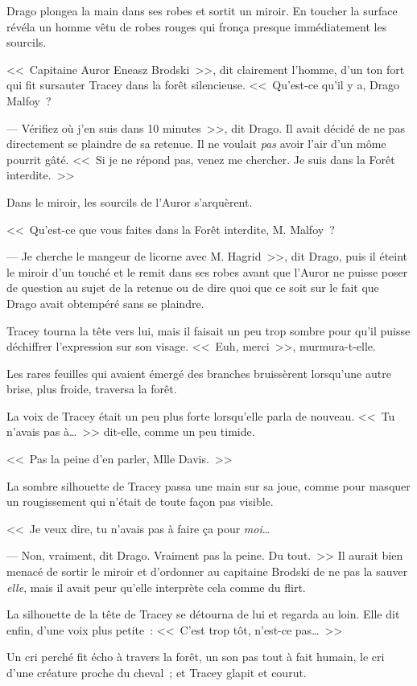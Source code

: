 Drago plongea la main dans ses robes et sortit un miroir. En toucher la surface révéla un homme vêtu de robes rouges qui fronça presque immédiatement les sourcils.

<<~Capitaine Auror Eneasz Brodski~>>, dit clairement l'homme, d'un ton fort qui fit sursauter Tracey dans la forêt silencieuse. <<~Qu'est-ce qu'il y a, Drago Malfoy~?

--- Vérifiez où j'en suis dans 10 minutes~>>, dit Drago. Il avait décidé de ne pas directement se plaindre de sa retenue. Il ne voulait \emph{pas} avoir l'air d'un môme pourrit gâté. <<~Si je ne répond pas, venez me chercher. Je suis dans la Forêt interdite.~>>

Dans le miroir, les sourcils de l'Auror s'arquèrent.

<<~Qu'est-ce que vous faites dans la Forêt interdite, M. Malfoy~?

--- Je cherche le mangeur de licorne avec M. Hagrid~>>, dit Drago, puis il éteint le miroir d'un touché et le remit dans ses robes avant que l'Auror ne puisse poser de question au sujet de la retenue ou de dire quoi que ce soit sur le fait que Drago avait obtempéré sans se plaindre.

Tracey tourna la tête vers lui, mais il faisait un peu trop sombre pour qu'il puisse déchiffrer l'expression sur son visage. <<~Euh, merci~>>, murmura-t-elle.

Les rares feuilles qui avaient émergé des branches bruissèrent lorsqu'une autre brise, plus froide, traversa la forêt.

La voix de Tracey était un peu plus forte lorsqu'elle parla de nouveau. <<~Tu n'avais pas à…~>> dit-elle, comme un peu timide.

<<~Pas la peine d'en parler, Mlle Davis.~>>

La sombre silhouette de Tracey passa une main sur sa joue, comme pour masquer un rougissement qui n'était de toute façon pas visible.

<<~Je veux dire, tu n'avais pas à faire ça pour \emph{moi}…

--- Non, vraiment, dit Drago. Vraiment pas la peine. Du tout.~>> Il aurait bien menacé de sortir le miroir et d'ordonner au capitaine Brodski de ne pas la sauver \emph{elle}, mais il avait peur qu'elle interprète cela comme du flirt.

La silhouette de la tête de Tracey se détourna de lui et regarda au loin. Elle dit enfin, d'une voix plus petite~: <<~C'est trop tôt, n'est-ce pas…~>>

Un cri perché fit écho à travers la forêt, un son pas tout à fait humain, le cri d'une créature proche du cheval~; et Tracey glapit et courut.

